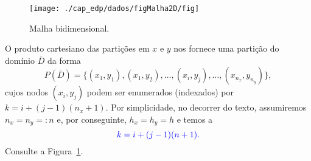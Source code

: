 \begin{figure}[H]
  \centering
  \texttt{[image: ./cap\_edp/dados/figMalha2D/fig]}
  \caption{Malha bidimensional.}
  \label{cap_edp_sec_poisson:fig:malha2D}
\end{figure}

O produto cartesiano das partições em $x$ e $y$ nos fornece uma partição do domínio $\overline{D}$ da forma
\begin{equation}
  P(\overline{D}) = \{(x_1, y_1), (x_1, y_2), \dotsc, (x_i, y_j), \dotsc, (x_{n_x}, y_{n_y})\},
\end{equation}
cujos nodos $(x_i, y_j)$ podem ser enumerados (indexados) por $k = i + (j-1)(n_x+1)$.  Por simplicidade, no decorrer do texto, assumiremos $n_x=n_y=:n$ e, por conseguinte, $h_x=h_y=h$ e temos a 
\begin{equation}\label{cap_edp_sec_poisson:eq:enum}\color{blue}k = i + (j-1)(n+1).
\end{equation}
Consulte a Figura~\ref{cap_edp_sec_poisson:fig:malha2D}.

\begin{flushleft}
\end{flushleft}

